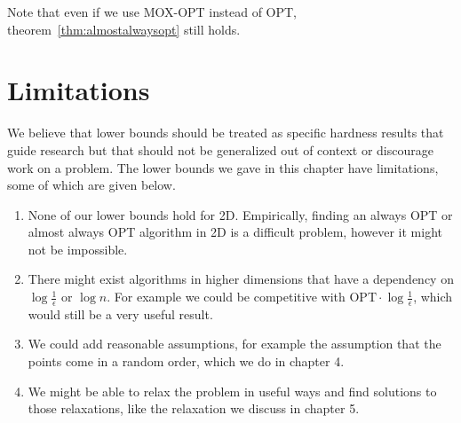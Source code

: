 Note that even if we use MOX-OPT instead of OPT, theorem~\ref{thm:almostalwaysopt} still holds.

\section{Limitations}

We believe that lower bounds should be treated as specific hardness results that guide research but that should not be generalized out of context or discourage work on a problem. The lower bounds we gave in this chapter have limitations, some of which are given below.

\begin{enumerate}
\item None of our lower bounds hold for 2D. Empirically, finding an always OPT or almost always OPT algorithm in 2D is a difficult problem, however it might not be impossible.
\item There might exist algorithms in higher dimensions that have a dependency on $\log{\frac{1}{\epsilon}}$ or $\log{n}$. For example we could be competitive with $\mbox{OPT} \cdot \log{\frac{1}{\epsilon}}$, which would still be a very useful result.
\item We could add reasonable assumptions, for example the assumption that the points come in a random order, which we do in chapter 4.
\item We might be able to relax the problem in useful ways and find solutions to those relaxations, like the relaxation we discuss in chapter 5.
\end{enumerate}

